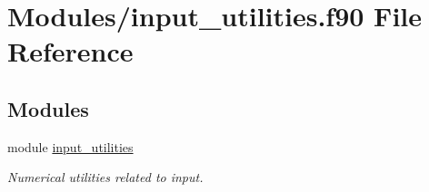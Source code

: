 \hypertarget{input__utilities_8f90}{}\section{Modules/input\+\_\+utilities.f90 File Reference}
\label{input__utilities_8f90}
\subsection*{Modules}
\begin{DoxyCompactItemize}
\item 
module \hyperlink{namespaceinput__utilities}{input\+\_\+utilities}
\begin{DoxyCompactList}\small\item\em Numerical utilities related to input. \end{DoxyCompactList}\end{DoxyCompactItemize}
